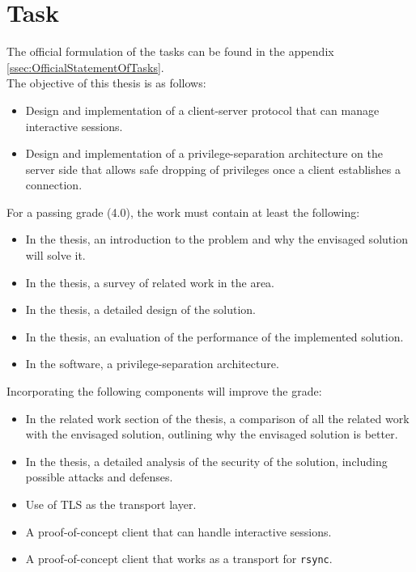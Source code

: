\documentclass[10pt,a4paper,titlepage,twoside,english,final]{zhawreprt}
\begin{document}
\section{Task}\label{sec:Task}
The official formulation of the tasks can be found in the appendix \ref{ssec:OfficialStatementOfTasks}.\\
The objective of this thesis is as follows:
\begin{itemize}
\item Design and implementation of a client-server protocol that can manage interactive sessions.
\item Design and implementation of a privilege-separation architecture on the server side that allows safe dropping of privileges once a client establishes a connection.
\end{itemize}

For a passing grade (4.0), the work must contain at least the following:
\begin{itemize}
\item In the thesis, an introduction to the problem and why the envisaged solution will solve it.
\item In the thesis, a survey of related work in the area.
\item In the thesis, a detailed design of the solution.
\item In the thesis, an evaluation of the performance of the implemented solution.
\item In the software, a privilege-separation architecture.
\end{itemize}

Incorporating the following components will improve the grade:
\begin{itemize}
\item In the related work section of the thesis, a comparison of all the related work with the envisaged solution, outlining why the envisaged solution is better.
\item In the thesis, a detailed analysis of the security of the solution, including possible attacks and defenses.
\item Use of TLS as the transport layer.
\item A proof-of-concept client that can handle interactive sessions.
\item A proof-of-concept client that works as a transport for \texttt{rsync}.
\end{itemize}
\end{document}
